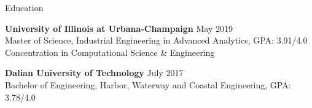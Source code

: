 \documentclass{resume} %
\begin{document}





\begin{rSection}{Education}



{\bf University of Illinois at Urbana-Champaign} \hfill {May 2019}
\\ 
Master of Science, Industrial Engineering in Advanced Analytics, GPA: 3.91/4.0
\\
Concentration in Computational Science \& Engineering

{\bf Dalian University of Technology} \hfill {July 2017}
\\ 
Bachelor of Engineering, Harbor, Waterway and Coastal Engineering, GPA: 3.78/4.0

\end{rSection}
\end{document}
